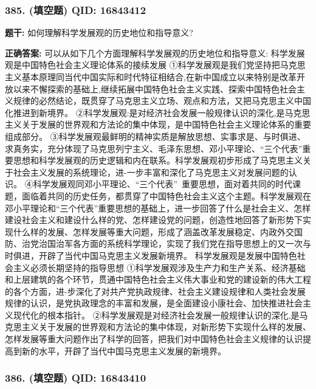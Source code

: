 \documentclass[12pt,UTF8]{ctexart}
\begin{document}
\vspace{0.3em}\hrulefill\vspace{0.7em}

\subsubsection*{385. (填空题) \small QID: 16843412}

\textbf{题干:}
如何理解科学发展观的历史地位和指导意义?

\textbf{正确答案:}
可以从如下几个方面理解科学发展观的历史地位和指导意义:
科学发展观是中国特色社会主义理论体系的接续发展
①科学发展观是我们党坚持把马克思主义基本原理同当代中国实际和时代特征相结合,在新中国成立以来特别是改革开放以来不懈探索的基础上,继续拓展中国特色社会主义实践、探索中国特色社会主义规律的必然结论，既贯穿了马克思主义立场、观点和方法，又把马克思主义中国化推进到新境界。
②科学发展观:是对经济社会发展一般规律认识的深化,是马克思主义关于发展的世界观和方法论的集中体现，是中国特色社会主义理论体系的重要组成部分。
③科学发展观最鲜明的精神实质是解放思想、实事求是、与时俱进、求真务实，充分体现了马克思列宁主义、毛泽东思想、邓小平理论、“三个代表”重要思想和科学发展观的历史逻辑和内在联系。科学发展观初步形成了马克思主义关于社会主义发展的系统理论，进-一步丰富和深化了马克思主义对发展问题的认识。
④科学发展观同邓小平理论、“三个代表” 重要思想，面对着共同的时代课题，面临着共同的历史任务，都贯穿了中国特色社会主义这个主题。科学发展观在邓小平理论和“三个代表”重要思想的基础上，进一步回答了什么是社会主义、怎样建设社会主义和建设什么样的党、怎样建设党的问题，创造性地回答了新形势下实现什么样的发展、怎样发展等重大问题，形成了涵盖改革发展稳定、内政外交国防、治党治国治军各方面的系统科学理论，实现了我们党在指导思想上的又一次与时俱进，开辟了当代中国马克思主义发展新境界。
科学发展观是发展中国特色社会主义必须长期坚持的指导思想
①科学发展观涉及生产力和生产关系、经济基础和上层建筑的各个环节，贯通中国特色社会主义伟大事业和党的建设新的伟大工程的各个方面，进-步深化了对共产党执政规律、社会主义建设规律和人类社会发展规律的认识，是党执政理念的丰富和发展，是全面建设小康社会、加快推进社会主义现代化的根本指针。
②科学发展观是对经济社会发展一般规律认识的深化,是马克思主义关于发展的世界观和方法论的集中体现，对新形势下实现什么样的发展、怎样发展等重大问题作出了科学的回答，把我们对中国特色社会主义规律的认识提高到新的水平，开辟了当代中国马克思主义发展的新境界。

\vspace{0.3em}\hrulefill\vspace{0.7em}

\subsubsection*{386. (填空题) \small QID: 16843410}
\end{document}
